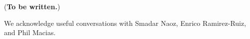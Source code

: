 \documentclass{emulateapj}
\begin{document}
({\bf To be written.})






\acknowledgments

We acknowledge useful conversations with Smadar Naoz, Enrico Ramirez-Ruiz, and Phil Macias.


\newcommand\icarus{\ref@jnl{Icarus}}%


\setlength{\baselineskip}{0.6\baselineskip}

\setlength{\baselineskip}{1.667\baselineskip}
\end{document}
